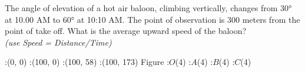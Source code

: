 
%
%
%
%
% 

\question[4] The angle of elevation of a hot air baloon, climbing vertically, changes from $\ang{30}$ at 10.00 AM to $\ang{60}$ at 10:10 AM. The point of observation is 300 meters from the point of take off. What is the average upward speed of the baloon? \\
\textit{(use Speed = Distance/Time)}

\ifprintanswers
	\begin{marginfigure}
		:(0, 0)
		:(100, 0)
		:(100, 58)
		:(100, 173)
		\figdrawbegin{}
			\figdrawline[1,2,3,4,1]
			\figdrawline[3,1]
		\figdrawend
		\figvisu{\figBoxA} {Figure}
		{
			:$O$(4)
			:$A$(4)
			:$B$(4)
			:$C$(4)
		}
		\centerline{\box\figBoxA}
	\end{marginfigure}
\fi 

